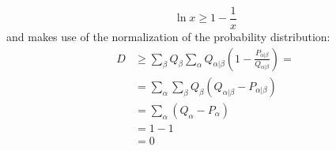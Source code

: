 \begin{equation}
\ln{x}\geq 1-\frac{1}{x}
\end{equation}
and makes use of the normalization of the probability distribution:
\begin{equation}
\begin{split}
D&\geq\sum_\beta Q_\beta\sum_\alpha Q_{\alpha|\beta}\left(1-\frac{P_{\alpha|\beta}}{Q_{\alpha|\beta}}\right)=\\
&=\sum_\alpha\sum_\beta Q_\beta(Q_{\alpha|\beta}-P_{\alpha|\beta})\\
&=\sum_\alpha(Q_\alpha-P_\alpha)\\
&=1-1\\
&=0
\end{split}
\end{equation}


